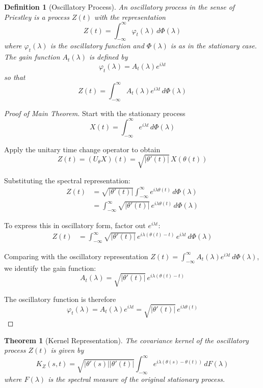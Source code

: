 \documentclass{article}
\newtheorem{theorem}{Theorem}
\newtheorem{definition}{Definition}
\begin{document}
\begin{definition}[Oscillatory Process]
An oscillatory process in the sense of Priestley is a process $Z(t)$ with the representation
\[
Z(t) = \int_{-\infty}^{\infty} \varphi_t(\lambda) \, d\Phi(\lambda)
\]
where $\varphi_t(\lambda)$ is the oscillatory function and $\Phi(\lambda)$ is as in the stationary case. The gain function $A_t(\lambda)$ is defined by
\[
\varphi_t(\lambda) = A_t(\lambda) e^{i\lambda t}
\]
so that
\[
Z(t) = \int_{-\infty}^{\infty} A_t(\lambda) e^{i\lambda t} \, d\Phi(\lambda)
\]
\end{definition}

\begin{proof}[Proof of Main Theorem]
Start with the stationary process
\[
X(t) = \int_{-\infty}^{\infty} e^{i\lambda t} \, d\Phi(\lambda)
\]

Apply the unitary time change operator to obtain
\[
Z(t) = (U_\theta X)(t) = \sqrt{|\theta'(t)|} \, X(\theta(t))
\]

Substituting the spectral representation:
\begin{align}
Z(t) &= \sqrt{|\theta'(t)|} \int_{-\infty}^{\infty} e^{i\lambda \theta(t)} \, d\Phi(\lambda)\\
&= \int_{-\infty}^{\infty} \sqrt{|\theta'(t)|} \, e^{i\lambda \theta(t)} \, d\Phi(\lambda)
\end{align}

To express this in oscillatory form, factor out $e^{i\lambda t}$:
\begin{align}
Z(t) &= \int_{-\infty}^{\infty} \sqrt{|\theta'(t)|} \, e^{i\lambda(\theta(t) - t)} \, e^{i\lambda t} \, d\Phi(\lambda)
\end{align}

Comparing with the oscillatory representation $Z(t) = \int_{-\infty}^{\infty} A_t(\lambda) e^{i\lambda t} \, d\Phi(\lambda)$, we identify the gain function:
\[
A_t(\lambda) = \sqrt{|\theta'(t)|} \, e^{i\lambda(\theta(t) - t)}
\]

The oscillatory function is therefore
\[
\varphi_t(\lambda) = A_t(\lambda) e^{i\lambda t} = \sqrt{|\theta'(t)|} \, e^{i\lambda \theta(t)}
\]
\end{proof}

\begin{theorem}[Kernel Representation]
The covariance kernel of the oscillatory process $Z(t)$ is given by
\[
K_Z(s,t) = \sqrt{|\theta'(s)||\theta'(t)|} \int_{-\infty}^{\infty} e^{i\lambda(\theta(s) - \theta(t))} \, dF(\lambda)
\]
where $F(\lambda)$ is the spectral measure of the original stationary process.
\end{theorem}
\end{document}
